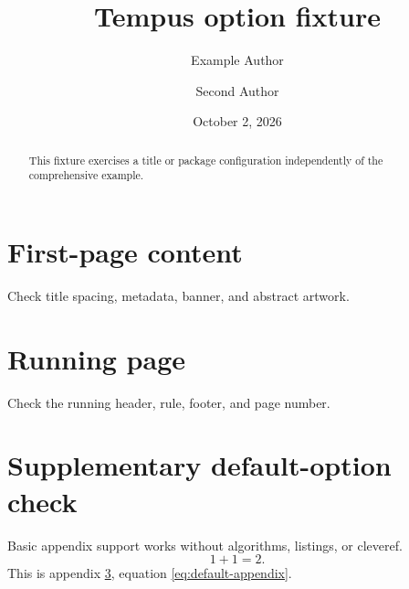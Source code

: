 \documentclass{tempusreport}
\title{Tempus option fixture}
\author{Example Author\and Second Author}
\date{October 2, 2026}
\begin{document}
\maketitle
\begin{abstract}This fixture exercises a title or package configuration independently of the comprehensive example.\end{abstract}
\section{First-page content}
Check title spacing, metadata, banner, and abstract artwork.

\clearpage\section{Running page}
Check the running header, rule, footer, and page number.
\clearpage
\appendix
\section{Supplementary default-option check}\label{sec:default-appendix}
Basic appendix support works without algorithms, listings, or cleveref.
\begin{equation}\label{eq:default-appendix}1+1=2.\end{equation}
This is appendix \ref{sec:default-appendix}, equation \ref{eq:default-appendix}.
\end{document}
